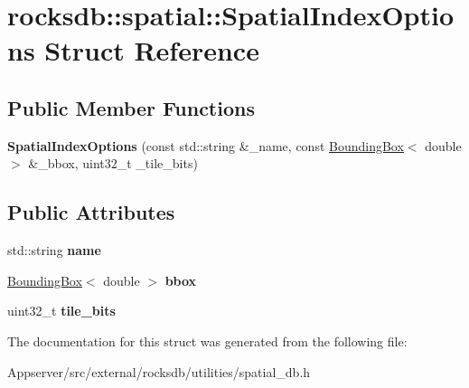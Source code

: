 \hypertarget{structrocksdb_1_1spatial_1_1SpatialIndexOptions}{}\section{rocksdb\+:\+:spatial\+:\+:Spatial\+Index\+Options Struct Reference}
\label{structrocksdb_1_1spatial_1_1SpatialIndexOptions}
\subsection*{Public Member Functions}
\begin{DoxyCompactItemize}
\item 
{\bfseries Spatial\+Index\+Options} (const std\+::string \&\+\_\+name, const \hyperlink{structrocksdb_1_1spatial_1_1BoundingBox}{Bounding\+Box}$<$ double $>$ \&\+\_\+bbox, uint32\+\_\+t \+\_\+tile\+\_\+bits)\hypertarget{structrocksdb_1_1spatial_1_1SpatialIndexOptions_a556a32cf2dcc4148158e67f0cd17cdd6}{}\label{structrocksdb_1_1spatial_1_1SpatialIndexOptions_a556a32cf2dcc4148158e67f0cd17cdd6}

\end{DoxyCompactItemize}
\subsection*{Public Attributes}
\begin{DoxyCompactItemize}
\item 
std\+::string {\bfseries name}\hypertarget{structrocksdb_1_1spatial_1_1SpatialIndexOptions_ada2ee0de20ca5c24886ace30a44eaa93}{}\label{structrocksdb_1_1spatial_1_1SpatialIndexOptions_ada2ee0de20ca5c24886ace30a44eaa93}

\item 
\hyperlink{structrocksdb_1_1spatial_1_1BoundingBox}{Bounding\+Box}$<$ double $>$ {\bfseries bbox}\hypertarget{structrocksdb_1_1spatial_1_1SpatialIndexOptions_a01533496d74846c7ef650e175c0d4f95}{}\label{structrocksdb_1_1spatial_1_1SpatialIndexOptions_a01533496d74846c7ef650e175c0d4f95}

\item 
uint32\+\_\+t {\bfseries tile\+\_\+bits}\hypertarget{structrocksdb_1_1spatial_1_1SpatialIndexOptions_a0f09285f664d89b030c6ac01d15fca14}{}\label{structrocksdb_1_1spatial_1_1SpatialIndexOptions_a0f09285f664d89b030c6ac01d15fca14}

\end{DoxyCompactItemize}


The documentation for this struct was generated from the following file\+:\begin{DoxyCompactItemize}
\item 
Appserver/src/external/rocksdb/utilities/spatial\+\_\+db.\+h\end{DoxyCompactItemize}
